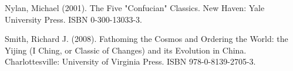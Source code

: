 \documentclass[conference]{IEEEtran}
\begin{document}
\begin{thebibliography}{1}
 Nylan, Michael (2001). The Five "Confucian" Classics. New Haven: Yale University Press. ISBN 0-300-13033-3.

 Smith, Richard J. (2008). Fathoming the Cosmos and Ordering the World: the Yijing (I Ching, or Classic of Changes) and its Evolution in China. Charlottesville: University of Virginia Press. ISBN 978-0-8139-2705-3.





\end{thebibliography}
\end{document}
